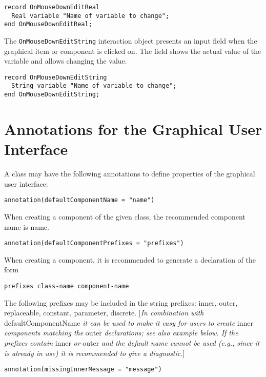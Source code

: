 \begin{lstlisting}[language=modelica]
record OnMouseDownEditReal
  Real variable "Name of variable to change";
end OnMouseDownEditReal;
\end{lstlisting}
The \lstinline!OnMouseDownEditString! interaction object presents an input field
when the graphical item or component is clicked on. The field shows the
actual value of the variable and allows changing the value.

\begin{lstlisting}[language=modelica]
record OnMouseDownEditString
  String variable "Name of variable to change";
end OnMouseDownEditString;
\end{lstlisting}
\section{Annotations for the Graphical User Interface}

A class may have the following annotations to define properties of the
graphical user interface:
\begin{lstlisting}[language=modelica]
 annotation(defaultComponentName = "name")
\end{lstlisting}

When creating a component of the given class, the recommended component
name is name.
\begin{lstlisting}[language=modelica]
  annotation(defaultComponentPrefixes = "prefixes")
\end{lstlisting}

When creating a component, it is recommended to generate a declaration
of the form
\begin{lstlisting}[language=modelica]
  prefixes class-name component-name
\end{lstlisting}

The following prefixes may be included in the string prefixes: inner,
outer, replaceable, constant, parameter, discrete. {[}\emph{In
combination with} defaultComponentName \emph{it can be used to make it
easy for users to create} inner \emph{components matching the} outer
\emph{declarations; see also example below. If the prefixes contain} inner \emph{or} outer
\emph{and the default name cannot be used (e.g., since it is already in use) it is recommended to give a diagnostic.}{]}
\begin{lstlisting}[language=modelica]
  annotation(missingInnerMessage = "message")
\end{lstlisting}

